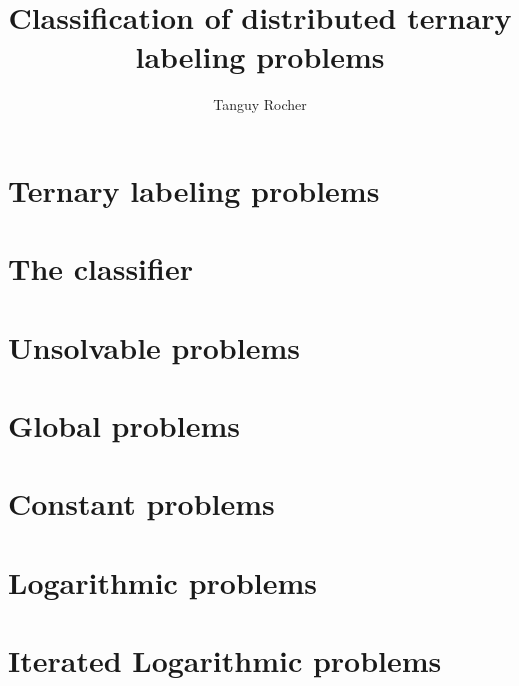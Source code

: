 
\title{Classification of distributed ternary labeling problems}
\author{Tanguy Rocher}



\maketitle

\tableofcontents
\newpage
\chapter{Ternary labeling problems}


\newpage
\chapter{The classifier}


\newpage
\chapter{Unsolvable problems}


\newpage
\chapter{Global problems}



\newpage
\chapter{Constant problems}


\newpage
\chapter{Logarithmic problems}


\newpage
\chapter{Iterated Logarithmic problems}




